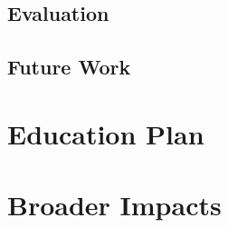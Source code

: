 \documentclass[12pt, titlepage]{article}
\begin{document}
\subsection*{Evaluation}
\subsection*{Future Work}

\section*{Education Plan}

\section*{Broader Impacts}  

\end{document}
